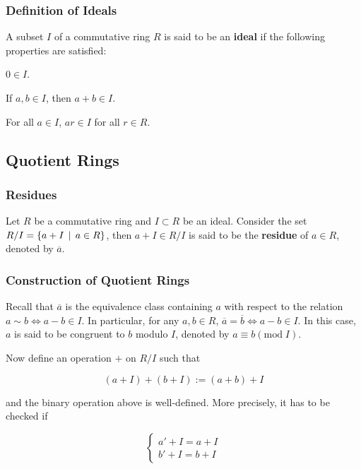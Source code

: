 \documentclass[a4paper,12pt]{article}
\begin{document}
\subsubsection{Definition of Ideals}
\begin{dft}
  A subset $I$ of a commutative ring $R$ is said to be an \textbf{ideal} if the following properties are satisfied:

  \begin{alist}
    \item $0\in I$.
    \item If $a,b\in I$, then $a+b\in I$.
    \item For all $a\in I$, $ar\in I$ for all $r\in R$.
  \end{alist}
\end{dft}

\subsection{Quotient Rings}
\subsubsection{Residues}
\begin{dft}
  Let $R$ be a commutative ring and $I\subset R$ be an ideal. Consider the set $R/I=\left\{ a+I\,\mid\, a\in R\right\}$, then $a+I\in R/I$ is said to be the \textbf{residue} of $a\in R$, denoted by $\overline{a}$.
\end{dft}

\subsubsection{Construction of Quotient Rings}
Recall that $\overline{a}$ is the equivalence class containing $a$ with respect to the relation $a\sim b\Leftrightarrow a-b\in I$. In particular, for any $a,b\in R$, $\overline{a}=\overline{b}\Leftrightarrow a-b\in I$. In this case, $a$ is said to be congruent to $b$ modulo $I$, denoted by $a\equiv b(\mathrm{mod}\;I)$.\n

Now define an operation $+$ on $R/I$ such that

$$(a+I)+(b+I):=(a+b)+I$$\s

and the binary operation above is well-defined. More precisely, it has to be checked if

$$\begin{cases}
  a'+I=a+I\\
  b'+I=b+I
\end{cases}$$\s
\end{document}
